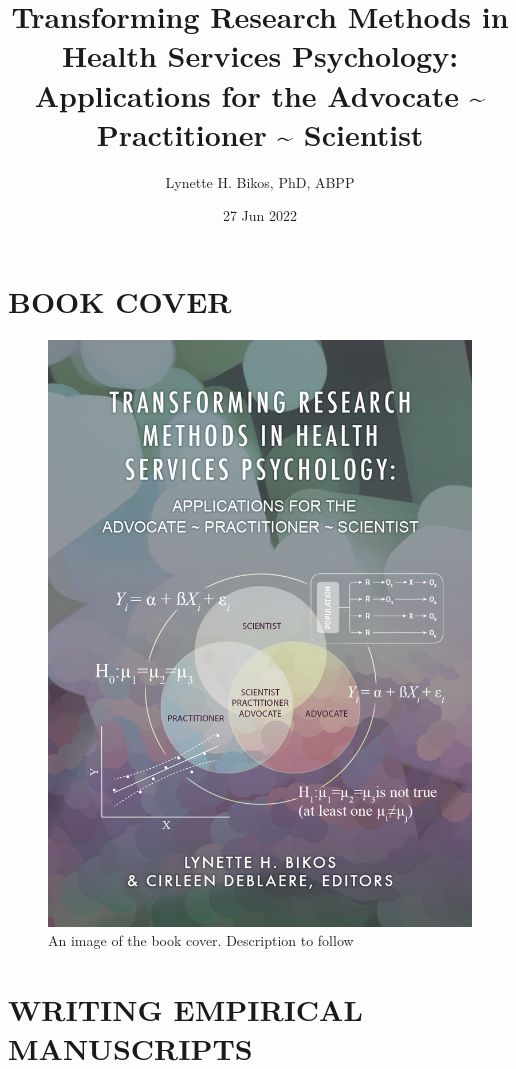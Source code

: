 \documentclass[
  11pt,
]{book}
\title{Transforming Research Methods in Health Services Psychology: Applications for the Advocate \textasciitilde{} Practitioner \textasciitilde{} Scientist}
\author{Lynette H. Bikos, PhD, ABPP}
\date{27 Jun 2022}
\begin{document}
\maketitle

{
\hypersetup{linkcolor=}
\setcounter{tocdepth}{3}
\tableofcontents
}
\hypertarget{book-cover}{%
\chapter*{BOOK COVER}\label{book-cover}}

\begin{figure}
\centering
\includegraphics{images/bookcover.png}
\caption{An image of the book cover. Description to follow}
\end{figure}

\hypertarget{writing-empirical-manuscripts}{%
\chapter*{WRITING EMPIRICAL MANUSCRIPTS}\label{writing-empirical-manuscripts}}
\end{document}
